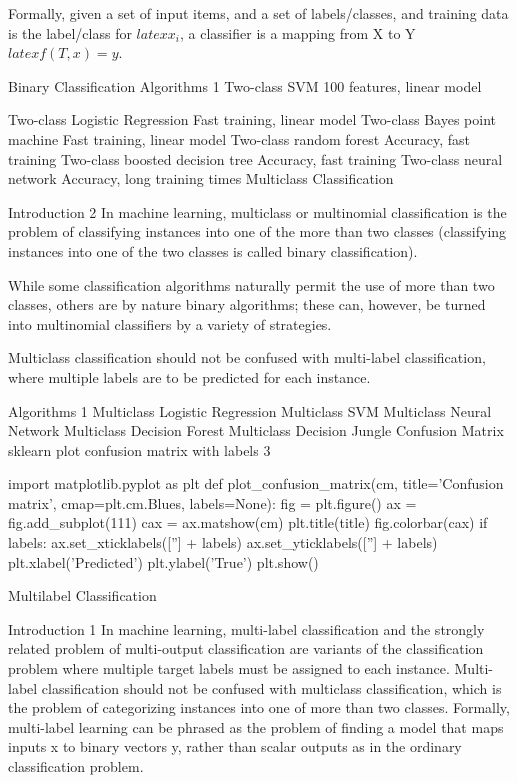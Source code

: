 Formally, given a set of input items,  and a set of labels/classes,  and training data is the label/class for $latex x_i$, a classifier is a mapping from X to Y $latex f(T, x) = y$.

Binary Classification
Algorithms 1
Two-class SVM
100 features, linear model

Two-class Logistic Regression
Fast training, linear model
Two-class Bayes point machine
Fast training, linear model
Two-class random forest
Accuracy, fast training
Two-class boosted decision tree
Accuracy, fast training
Two-class neural network
Accuracy, long training times
Multiclass Classification


Introduction 2
In machine learning, multiclass or multinomial classification is the problem of classifying instances into one of the more than two classes (classifying instances into one of the two classes is called binary classification).

While some classification algorithms naturally permit the use of more than two classes, others are by nature binary algorithms; these can, however, be turned into multinomial classifiers by a variety of strategies.

Multiclass classification should not be confused with multi-label classification, where multiple labels are to be predicted for each instance.

Algorithms 1
Multiclass Logistic Regression
Multiclass SVM
Multiclass Neural Network
Multiclass Decision Forest
Multiclass Decision Jungle
Confusion Matrix
sklearn plot confusion matrix with labels 3

import matplotlib.pyplot as plt
def plot_confusion_matrix(cm, title='Confusion matrix', cmap=plt.cm.Blues, labels=None):
    fig = plt.figure()
    ax = fig.add_subplot(111)
    cax = ax.matshow(cm)
    plt.title(title)
    fig.colorbar(cax)
    if labels:
        ax.set_xticklabels([''] + labels)
        ax.set_yticklabels([''] + labels)
    plt.xlabel('Predicted')
    plt.ylabel('True')
    plt.show()


Multilabel Classification


Introduction 1
In machine learning, multi-label classification and the strongly related problem of multi-output classification are variants of the classification problem where multiple target labels must be assigned to each instance. Multi-label classification should not be confused with multiclass classification, which is the problem of categorizing instances into one of more than two classes. Formally, multi-label learning can be phrased as the problem of finding a model that maps inputs x to binary vectors y, rather than scalar outputs as in the ordinary classification problem.

